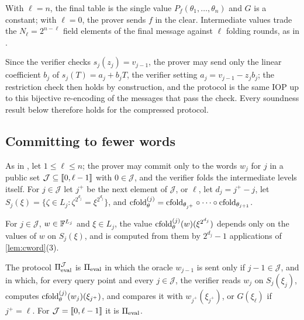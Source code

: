 \begin{remark}\label{rem:stop}
With $\ell = n$, the final table is the single value $P_f(\theta_1,\dots,\theta_n)$ and $G$ is a constant; with $\ell = 0$, the prover sends $f$ in the clear.
Intermediate values trade the $N_\ell = 2^{n-\ell}$ field elements of the final message against $\ell$ folding rounds, as in .
\end{remark}

\begin{remark}\label{rem:compress}
Since the verifier checks $s_j(z_j) = v_{j-1}$, the prover may send only the linear coefficient $b_j$ of $s_j(T) = a_j + b_j T$, the verifier setting $a_j = v_{j-1} - z_j b_j$; the restriction check then holds by construction, and the protocol is the same IOP up to this bijective re-encoding of the messages that pass the check.
Every soundness result below therefore holds for the compressed protocol.
\end{remark}

\subsection{Committing to fewer words}\label{sec:scheme:skip}

As in , let $1 \le \ell \le n$; the prover may commit only to the words $w_j$ for $j$ in a public set $\mathcal{J} \subseteq \llbracket 0, \ell-1 \rrbracket$ with $0 \in \mathcal{J}$, and the verifier folds the intermediate levels itself.
For $j \in \mathcal{J}$ let $j^+$ be the next element of $\mathcal{J}$, or $\ell$, let $d_j = j^+ - j$, let $S_j(\xi) = \{\zeta \in L_j : \zeta^{2^{d_j}} = \xi^{2^{d_j}}\}$, and $\mathrm{cfold}^{(j)}_\theta = \mathrm{cfold}_{\theta_{j^+}} \circ \dots \circ \mathrm{cfold}_{\theta_{j+1}}$.

\begin{lemma}\label{lem:local-fold}
For $j \in \mathcal{J}$, $w \in \mathbb{F}^{L_j}$ and $\xi \in L_j$, the value $\mathrm{cfold}^{(j)}_\theta(w)(\xi^{2^{d_j}})$ depends only on the values of $w$ on $S_j(\xi)$, and is computed from them by $2^{d_j} - 1$ applications of \cref{lem:cword}(3).
\end{lemma}

The protocol $\Pi_{\mathrm{eval}}^{\mathcal{J}}$ is $\Pi_{\mathrm{eval}}$ in which the oracle $w_{j-1}$ is sent only if $j - 1 \in \mathcal{J}$, and in which, for every query point and every $j \in \mathcal{J}$, the verifier reads $w_j$ on $S_j(\xi_j)$, computes $\mathrm{cfold}^{(j)}_\theta(w_j)(\xi_{j^+})$, and compares it with $w_{j^+}(\xi_{j^+})$, or $G(\xi_\ell)$ if $j^+ = \ell$.
For $\mathcal{J} = \llbracket 0, \ell-1 \rrbracket$ it is $\Pi_{\mathrm{eval}}$.


